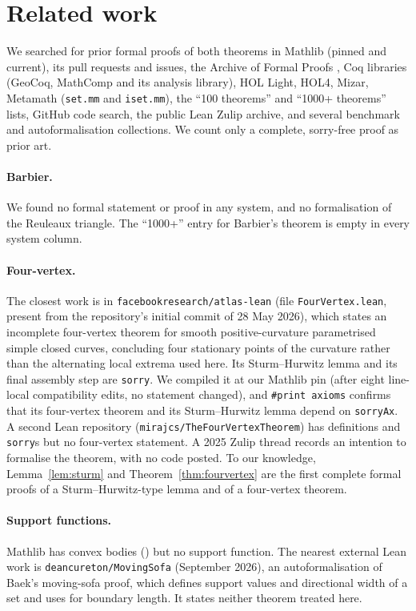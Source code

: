 \documentclass[11pt]{article}
\theoremstyle{definition}
\theoremstyle{remark}
\newcommand{\lean}[1]{\texttt{#1}}
\begin{document}
\section{Related work}\label{sec:related}

We searched for prior formal proofs of both theorems in Mathlib (pinned and current), its pull
requests and issues, the Archive of Formal Proofs \cite{afp}, Coq libraries (GeoCoq, MathComp and its analysis
library), HOL Light, HOL4, Mizar, Metamath (\texttt{set.mm} and \texttt{iset.mm}), the ``100
theorems'' and ``1000+ theorems'' lists, GitHub code search, the public Lean Zulip archive, and
several benchmark and autoformalisation collections. We count only a complete, sorry-free proof as
prior art.

\paragraph{Barbier.} We found no formal statement or proof in any system, and no formalisation of the
Reuleaux triangle. The ``1000+'' entry for Barbier's theorem is empty in every system column.

\paragraph{Four-vertex.} The closest work is in \texttt{facebookresearch/atlas-lean} \cite{atlaslean}
(file \texttt{FourVertex.lean}, present from the repository's initial commit of 28 May 2026), which
states an incomplete four-vertex theorem for smooth positive-curvature parametrised simple closed
curves, concluding four stationary points of the curvature rather than the alternating local extrema
used here. Its Sturm--Hurwitz lemma and
its final assembly step are \lean{sorry}. We compiled it at our Mathlib pin (after eight line-local
compatibility edits, no statement changed), and \lean{\#print axioms} confirms that its four-vertex
theorem and its Sturm--Hurwitz lemma depend on \lean{sorryAx}. A second Lean repository
(\texttt{mirajcs/TheFourVertexTheorem}) \cite{mirajcs} has definitions and \lean{sorry}s but no four-vertex
statement. A 2025 Zulip thread records an intention to formalise the theorem, with no code posted. To
our knowledge, Lemma~\ref{lem:sturm} and Theorem~\ref{thm:fourvertex} are the first complete formal
proofs of a Sturm--Hurwitz-type lemma and of a four-vertex theorem.

\paragraph{Support functions.} Mathlib has convex bodies () but no support function.
The nearest external Lean work is \texttt{deancureton/MovingSofa} \cite{movingssofa} (September 2026), an
autoformalisation of Baek's \cite{baek2024} moving-sofa proof, which defines support values and directional width of
a set and uses  for boundary length. It states neither theorem treated here.
\end{document}
